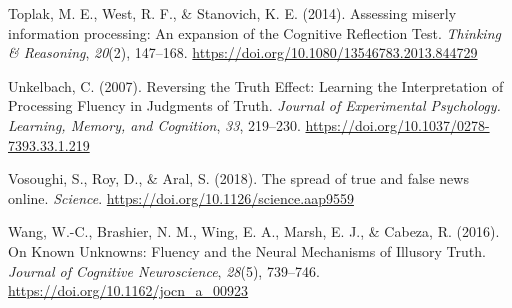 \documentclass[10pt, letterpaper]{article}
\newenvironment{CSLReferences}%
  {}%
  {\par}
\begin{document}
\begin{CSLReferences}
\leavevmode\hypertarget{ref-toplak.etal2014}{}%
Toplak, M. E., West, R. F., \& Stanovich, K. E. (2014). Assessing
miserly information processing: {An} expansion of the {Cognitive}
{Reflection} {Test}. \emph{Thinking \& Reasoning}, \emph{20}(2),
147--168. \url{https://doi.org/10.1080/13546783.2013.844729}

\leavevmode\hypertarget{ref-unkelbach2007}{}%
Unkelbach, C. (2007). Reversing the {Truth} {Effect}: {Learning} the
{Interpretation} of {Processing} {Fluency} in {Judgments} of {Truth}.
\emph{Journal of Experimental Psychology. Learning, Memory, and
Cognition}, \emph{33}, 219--230.
\url{https://doi.org/10.1037/0278-7393.33.1.219}

\leavevmode\hypertarget{ref-vosoughi.etal2018}{}%
Vosoughi, S., Roy, D., \& Aral, S. (2018). The spread of true and false
news online. \emph{Science}.
\url{https://doi.org/10.1126/science.aap9559}

\leavevmode\hypertarget{ref-wang.etal2016}{}%
Wang, W.-C., Brashier, N. M., Wing, E. A., Marsh, E. J., \& Cabeza, R.
(2016). On {Known} {Unknowns}: {Fluency} and the {Neural} {Mechanisms}
of {Illusory} {Truth}. \emph{Journal of Cognitive Neuroscience},
\emph{28}(5), 739--746. \url{https://doi.org/10.1162/jocn_a_00923}

\end{CSLReferences}


\end{document}
